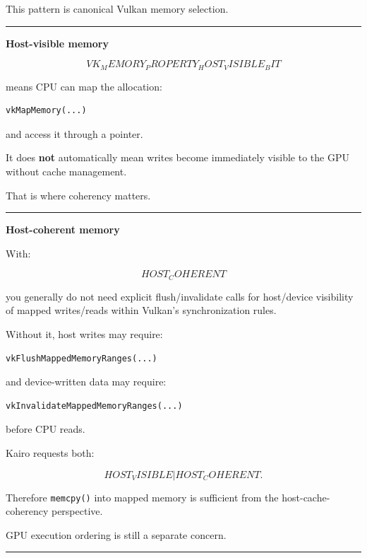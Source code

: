 This pattern is canonical Vulkan memory selection.

\begin{center}\rule{0.5\linewidth}{0.5pt}\end{center}

\textbf{Host-visible memory}

\[
VK_MEMORY_PROPERTY_HOST_VISIBLE_BIT
\]

means CPU can map the allocation:

\begin{verbatim}
vkMapMemory(...)
\end{verbatim}

and access it through a pointer.

It does \textbf{not} automatically mean writes become immediately visible to the GPU without cache management.

That is where coherency matters.

\begin{center}\rule{0.5\linewidth}{0.5pt}\end{center}

\textbf{Host-coherent memory}

With:

\[
HOST_COHERENT
\]

you generally do not need explicit flush/invalidate calls for host/device visibility of mapped writes/reads within Vulkan's synchronization rules.

Without it, host writes may require:

\begin{verbatim}
vkFlushMappedMemoryRanges(...)
\end{verbatim}

and device-written data may require:

\begin{verbatim}
vkInvalidateMappedMemoryRanges(...)
\end{verbatim}

before CPU reads.

Kairo requests both:

\[
HOST_VISIBLE
|
HOST_COHERENT.
\]

Therefore \texttt{memcpy()} into mapped memory is sufficient from the host-cache-coherency perspective.

GPU execution ordering is still a separate concern.

\begin{center}\rule{0.5\linewidth}{0.5pt}\end{center}

